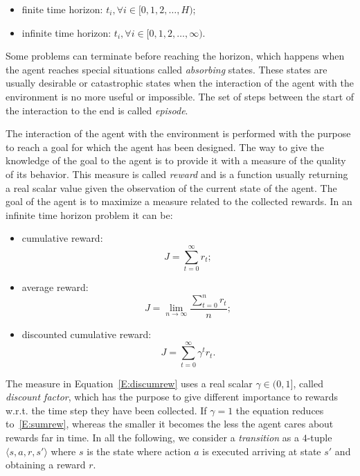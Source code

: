 \begin{itemize}
 \item finite time horizon: $t_i, \forall i \in [0, 1, 2, \dots, H)$;
 \item infinite time horizon: $t_i, \forall i \in [0, 1, 2, \dots, \infty)$.
\end{itemize}
Some problems can terminate before reaching the horizon, which happens when the agent reaches special situations called \textit{absorbing} states. These states are usually desirable or catastrophic states when the interaction of the agent with the environment is no more useful or impossible. The set of steps between the start of the interaction to the end is called \textit{episode}.

The interaction of the agent with the environment is performed with the purpose to reach a goal for which the agent has been designed. The way to give the knowledge of the goal to the agent is to provide it with a measure of the quality of its behavior. This measure is called \textit{reward} and is a function usually returning a real scalar value given the observation of the current state of the agent. The goal of the agent is to maximize a measure related to the collected rewards. In an infinite time horizon problem it can be:
\begin{itemize}
 \item cumulative reward:
 \begin{equation}\label{E:sumrew}
  J = \sum_{t=0}^\infty r_t;
 \end{equation}
\item average reward:
\begin{equation}
 J = \lim_{n\to\infty}\dfrac{\sum_{t=0}^n r_t}{n};
\end{equation}
\item discounted cumulative reward:
\begin{equation}\label{E:discumrew}
 J = \sum_{t=0}^\infty \gamma^t r_t.
\end{equation}
\end{itemize}
The measure in Equation~\ref{E:discumrew} uses a real scalar $\gamma \in (0, 1]$, called \textit{discount factor}, which has the purpose to give different importance to rewards w.r.t. the time step they have been collected. If $\gamma = 1$ the equation reduces to~\ref{E:sumrew}, whereas the smaller it becomes the less the agent cares about rewards far in time. In all the following, we consider a \textit{transition} as a $4$-tuple $\langle s,a,r,s' \rangle$ where $s$ is the state where action $a$ is executed arriving at state $s'$ and obtaining a reward $r$.


